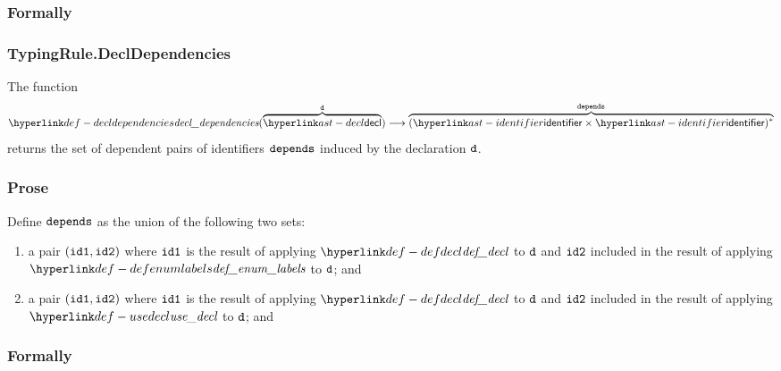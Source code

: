 \subsubsection{Formally}
\begin{mathpar}
\end{mathpar}

\subsubsection{TypingRule.DeclDependencies \label{sec:TypingRule.DeclDependencies}}
\hypertarget{def-decldependencies}{}
The function
\[
\decldependencies(\overname{\decl}{\vd}) \aslto \overname{(\identifier\times\identifier)^*}{\dependencies}
\]
returns the set of dependent pairs of identifiers $\dependencies$ induced by the declaration $\vd$.

\subsubsection{Prose}
Define $\dependencies$ as the union of the following two sets:
\begin{enumerate}
  \item a pair $(\idone, \idtwo)$ where $\idone$ is the result of applying $\defdecl$ to $\vd$
        and $\idtwo$ included in the result of applying $\defenumlabels$ to $\vd$; and
  \item a pair $(\idone, \idtwo)$ where $\idone$ is the result of applying $\defdecl$ to $\vd$
        and $\idtwo$ included in the result of applying $\usedecl$ to $\vd$; and
\end{enumerate}

\subsubsection{Formally}
\begin{mathpar}
\end{mathpar}

